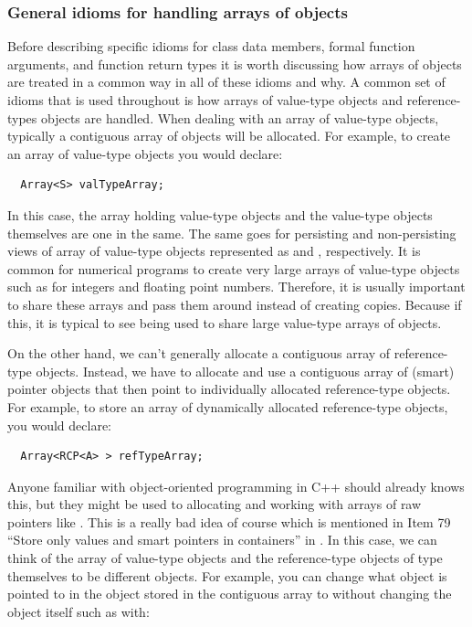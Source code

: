 \documentclass[pdf,ps2pdf,11pt]{SANDreport}
\begin{document}
%
{}\subsubsection{General idioms for handling arrays of objects}
%

Before describing specific idioms for class data members, formal
function arguments, and function return types it is worth discussing
how arrays of objects are treated in a common way in all of these
idioms and why.  A common set of idioms that is used throughout is how
arrays of value-type objects and reference-types objects are handled.
When dealing with an array of value-type objects, typically a
contiguous array of objects will be allocated.  For example, to create
an array of value-type objects you would declare:

{\small\begin{verbatim}
  Array<S> valTypeArray;
\end{verbatim}}

In this case, the array holding value-type objects and the value-type
objects themselves are one in the same.  The same goes for persisting
and non-persisting views of array of value-type objects represented as
{} and {},
respectively.  It is common for numerical programs to create very
large arrays of value-type objects such as for integers and floating
point numbers.  Therefore, it is usually important to share these
arrays and pass them around instead of creating copies.  Because if
this, it is typical to see {} being used
to share large value-type arrays of objects.

On the other hand, we can't generally allocate a contiguous array of
reference-type objects.  Instead, we have to allocate and use a
contiguous array of (smart) pointer objects that then point to
individually allocated reference-type objects.  For example, to store
an array of dynamically allocated reference-type objects, you would
declare:

{\small\begin{verbatim}
  Array<RCP<A> > refTypeArray;
\end{verbatim}}

Anyone familiar with object-oriented programming in C++ should already
knows this, but they might be used to allocating and working with
arrays of raw pointers like {}.  This is a
really bad idea of course which is mentioned in Item 79 ``Store only
values and smart pointers in containers'' in
{}\cite{C++CodingStandards05}.  In this case, we can think of the
array of {} value-type objects and the reference-type
objects of type {} themselves to be different objects.  For
example, you can change what {} object is pointed to in the
{} object stored in the contiguous array to without
changing the {} object itself such as with:
\end{document}
